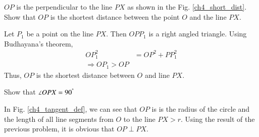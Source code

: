 %
\begin{problem}
	$OP$ is the perpendicular to the line $PX$ as shown in the Fig. \ref{ch4_short_dist}. Show that $OP$ is the shortest distance between the point $O$ and the line $PX$. 
\end{problem}
\proof Let $P_1$ be a point on the line $PX$. Then $OPP_1$ is a right angled triangle.  Using Budhayana's theorem,
%
\begin{equation}
\begin{split}
OP_1^2 &= OP^2 + PP_1^2 \\
\Rightarrow OP_1 > OP
\end{split}
\end{equation}
%
Thus, $OP$ is the shortest distance between $O$ and line $PX$.
%
\begin{problem}
Show that $\angle OPX = 90 ^{\degree}$
\end{problem}
\proof In Fig. \ref{ch4_tangent_def}, we can see that $OP$ is is the radius of the circle and the length of all line segments from $O$ to the line $PX > r$.  Using the result of the previous 
problem, it is obvious that $OP \perp PX$. 
%
